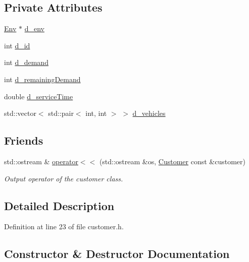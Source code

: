 \subsection*{Private Attributes}
\begin{DoxyCompactItemize}
\item 
\hyperlink{class_env}{Env} $\ast$ \hyperlink{class_customer_a3bab068704f4b100581f694b1b5d498e}{d\+\_\+env}
\item 
int \hyperlink{class_customer_aec19536bdd04638512d821cd699481e1}{d\+\_\+id}
\item 
int \hyperlink{class_customer_aa3772ede1c8e9222fa0c4aca8c06b06c}{d\+\_\+demand}
\item 
int \hyperlink{class_customer_a24e8165587de656159a3fdd3eaa680ad}{d\+\_\+remaining\+Demand}
\item 
double \hyperlink{class_customer_aa220a35dae020652125de1099cc8e178}{d\+\_\+service\+Time}
\item 
std\+::vector$<$ std\+::pair$<$ int, int $>$ $>$ \hyperlink{class_customer_a51f0603ebcf0712f223b34d66eae0f0c}{d\+\_\+vehicles}
\end{DoxyCompactItemize}
\subsection*{Friends}
\begin{DoxyCompactItemize}
\item 
std\+::ostream \& \hyperlink{class_customer_a3d7eef7f15d078958c6bbd64019e20fa}{operator$<$$<$} (std\+::ostream \&os, \hyperlink{class_customer}{Customer} const \&customer)
\begin{DoxyCompactList}\small\item\em Output operator of the customer class. \end{DoxyCompactList}\end{DoxyCompactItemize}


\subsection{Detailed Description}


Definition at line 23 of file customer.\+h.



\subsection{Constructor \& Destructor Documentation}
\mbox{\label{class_customer_aaa83636312ec0431684c8d898a21ad69}} 
